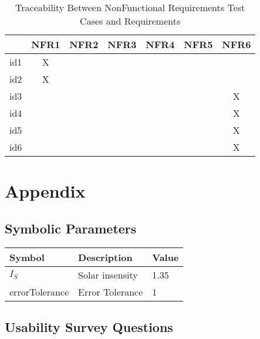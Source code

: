 \documentclass[12pt, titlepage]{article}
\begin{document}
\begin{table}[h!]
\centering
\begin{tabular}{|c|c|c|c|c|c|c|}
\hline        
	& NFR1& NFR2 & NFR3 &NFR4 & NFR5 &NFR6 \\
\hline
id1        & X &    &     &    &    &     \\ \hline
id2        & X &    &     &    &    &     \\ \hline
id3        &    &    &     &    &    & X  \\ \hline
id4        &    &    &     &    &    & X  \\ \hline
id5        &    &    &     &    &    & X  \\ \hline
id6        &    &    &     &    &    & X  \\ \hline


\hline
\end{tabular}
\caption{Traceability Between NonFunctional Requirements Test Cases and
Requirements}
\label{Table:NFRtrace}
\end{table}




\newpage


 
%


\newpage

\section{Appendix}


\subsection{Symbolic Parameters}

  \noindent \begin{tabular}{l l l} 
    \toprule		
    \textbf{Symbol} & \textbf{Description} & \textbf{Value}\\
    \midrule 
    $I_{S}$ & Solar insensity &1.35  \\
errorTolerance & Error Tolerance & 1\\
    \bottomrule
  \end{tabular}


\subsection{Usability Survey Questions}
\end{document}
